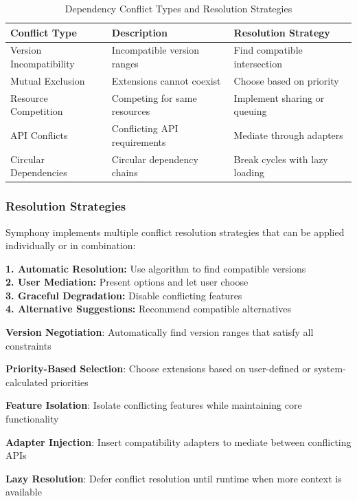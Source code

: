\begin{table}[h]
\centering
\caption{Dependency Conflict Types and Resolution Strategies}
\label{tab:conflict-types}
\begin{tabular}{@{}lll@{}}
\toprule
\textbf{Conflict Type} & \textbf{Description} & \textbf{Resolution Strategy} \\
\midrule
Version Incompatibility & Incompatible version ranges & Find compatible intersection \\
Mutual Exclusion & Extensions cannot coexist & Choose based on priority \\
Resource Competition & Competing for same resources & Implement sharing or queuing \\
API Conflicts & Conflicting API requirements & Mediate through adapters \\
Circular Dependencies & Circular dependency chains & Break cycles with lazy loading \\
\bottomrule
\end{tabular}
\end{table}

\subsubsection{Resolution Strategies}
\label{subsubsec:resolution-strategies}

Symphony implements multiple conflict resolution strategies that can be applied individually or in combination:

\begin{infobox}[title=Conflict Resolution Hierarchy]
\textbf{1. Automatic Resolution:} Use algorithm to find compatible versions \\
\textbf{2. User Mediation:} Present options and let user choose \\
\textbf{3. Graceful Degradation:} Disable conflicting features \\
\textbf{4. Alternative Suggestions:} Recommend compatible alternatives
\end{infobox}

\begin{expandedlist}
\item \textbf{Version Negotiation}: Automatically find version ranges that satisfy all constraints
\item \textbf{Priority-Based Selection}: Choose extensions based on user-defined or system-calculated priorities
\item \textbf{Feature Isolation}: Isolate conflicting features while maintaining core functionality
\item \textbf{Adapter Injection}: Insert compatibility adapters to mediate between conflicting APIs
\item \textbf{Lazy Resolution}: Defer conflict resolution until runtime when more context is available
\end{expandedlist}

